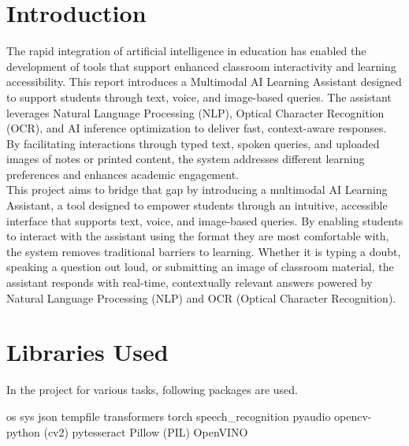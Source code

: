\documentclass{josis}
\begin{document}
\section{Introduction}
The rapid integration of artificial intelligence in education has enabled the development of tools that support enhanced classroom interactivity and learning accessibility. This report introduces a Multimodal AI Learning Assistant designed to support students through text, voice, and image-based queries. The assistant leverages Natural Language Processing (NLP), Optical Character Recognition (OCR), and AI inference optimization to deliver fast, context-aware responses. By facilitating interactions through typed text, spoken queries, and uploaded images of notes or printed content, the system addresses different learning preferences and enhances academic engagement.
\\This project aims to bridge that gap by introducing a multimodal AI Learning Assistant, a tool designed to empower students through an intuitive, accessible interface that supports text, voice, and image-based queries. By enabling students to interact with the assistant using the format they are most comfortable with, the system removes traditional barriers to learning.  Whether it is typing a doubt, speaking a question out loud, or submitting an image of classroom material, the assistant responds with real-time, contextually relevant answers powered by Natural Language Processing (NLP) and OCR (Optical Character Recognition).

\section{Libraries Used}
In the project for various tasks, following packages are used.
\begin{python}
os
sys 
json
tempfile
transformers 
torch
speech_recognition
pyaudio
opencv-python (cv2) 
pytesseract
Pillow (PIL)
OpenVINO

\end{python}
\end{document}

